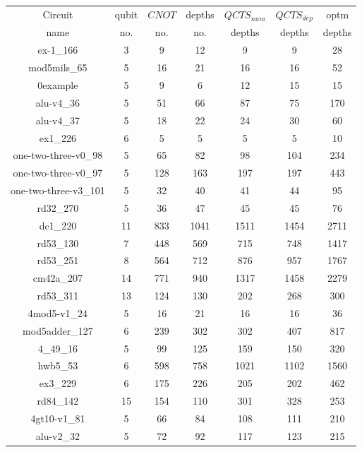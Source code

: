 \documentclass[runningheads]{llncs}
\begin{document}
						\begin{table}[H]
							\begin{center}  
							\begin{tabular}{|c|c|c|c|c|c|c|}
							\hline
							Circuit &  qubit  & $CNOT$ &depths &$QCTS_{num}$& $QCTS_{dep}$  & optm 	  	\\
							 name	&   no. 	&	no. & no. & depths&  depths &  depths 	\\
							\hline
							ex-1\_166 & 3 & 9 & 12 & 9 & 9 & 28 \\
							mod5mils\_65 & 5 & 16 & 21 & 16 & 16 & 52 \\
							0example & 5 & 9 & 6 & 12 & 15 & 15 \\
							alu-v4\_36 & 5 & 51 & 66 & 87 & 75 & 170 \\
							alu-v4\_37 & 5 & 18 & 22 & 24 & 30 & 60 \\
							ex1\_226 & 6 & 5 & 5 & 5 & 5 & 10 \\
							one-two-three-v0\_98 & 5 & 65 & 82 & 98 & 104 & 234 \\
							one-two-three-v0\_97 & 5 & 128 & 163 & 197 & 197 & 443 \\
							one-two-three-v3\_101 & 5 & 32 & 40 & 41 & 44 & 95 \\
							rd32\_270 & 5 & 36 & 47 & 45 & 45 & 76 \\
							dc1\_220 & 11 & 833 & 1041 & 1511 & 1454 & 2711 \\
							rd53\_130 & 7 & 448 & 569 & 715 & 748 & 1417 \\
							rd53\_251 & 8 & 564 & 712 & 876 & 957 & 1767 \\
							cm42a\_207 & 14 & 771 & 940 & 1317 & 1458 & 2279 \\
							rd53\_311 & 13 & 124 & 130 & 202 & 268 & 300 \\
							4mod5-v1\_24 & 5 & 16 & 21 & 16 & 16 & 36 \\
							mod5adder\_127 & 6 & 239 & 302 & 302 & 407 & 817 \\
							4\_49\_16 & 5 & 99 & 125 & 159 & 150 & 320 \\
							hwb5\_53 & 6 & 598 & 758 & 1021 & 1102 & 1560 \\
							ex3\_229 & 6 & 175 & 226 & 205 & 202 & 462 \\
							rd84\_142 & 15 & 154 & 110 & 301 & 328 & 253 \\
							4gt10-v1\_81 & 5 & 66 & 84 & 108 & 111 & 210 \\
							alu-v2\_32 & 5 & 72 & 92 & 117 & 123 & 215 \\

\end{tabular}
\end{center}
\end{table}
\end{document}

